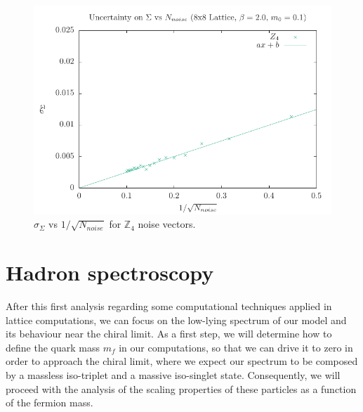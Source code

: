\begin{figure}[H]
    \centering
    \includegraphics[width=0.8\linewidth]{images/dev_z4.pdf}
    \caption{$\sigma_\Sigma$ vs $1/\sqrt{N_{noise}}$ for $\mathbb{Z}_4$ noise vectors.}
    \label{fig:dev_z4}
\end{figure}
\newpage
\section{Hadron spectroscopy}
After this first analysis regarding some computational techniques applied in lattice computations, we can focus on the low-lying spectrum of our model and its behaviour near the chiral limit. As a first step, we will determine how to define the quark mass $m_f$ in our computations, so that we can drive it to zero in order to approach the chiral limit, where we expect our spectrum to be composed by a massless iso-triplet and a massive iso-singlet state. Consequently, we will proceed with the analysis of the scaling properties of these particles as a function of the fermion mass.
